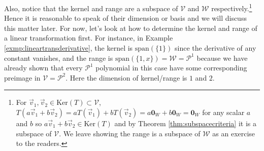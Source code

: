 Also, notice that the kernel and range are a subspace of $\mathcal{V}$ and $\mathcal{W}$ respectively.\footnote{For $\vec{v}_1, \vec{v}_2 \in \text{Ker}(T) \subset \mathcal{V}$, $T(a\vec{v}_1 + b\vec{v}_2) = aT(\vec{v}_1) + bT(\vec{v}_2) = a\textbf{0}_W + b\textbf{0}_W = \textbf{0}_W$ for any scalar $a$ and $b$ so $a\vec{v}_1 + b\vec{v}_2 \in \text{Ker}(T)$ and by Theorem \ref{thm:subspacecriteria} it is a subspace of $\mathcal{V}$. We leave showing the range is a subspace of $\mathcal{W}$ as an exercise to the readers.} Hence it is reasonable to speak of their dimension or basis and we will discuss this matter later. For now, let's look at how to determine the kernel and range of a linear transformation first. For instance, in Example \ref{exmp:lineartransderivative}, the kernel is $\text{span}(\{1\})$ since the derivative of any constant vanishes, and the range is $\text{span}(\{1, x\}) = \mathcal{W} = \mathcal{P}^1$ because we have already shown that every $\mathcal{P}^1$ polynomial in this case have some corresponding preimage in $\mathcal{V} = \mathcal{P}^2$. Here the dimension of kernel/range is $1$ and $2$.

